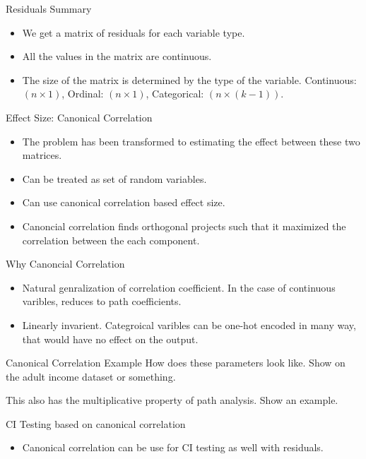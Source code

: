 \documentclass{beamer}
\begin{document}
\begin{frame}{Residuals Summary}
	\begin{itemize}
		\item We get a matrix of residuals for each variable type.
		\item All the values in the matrix are continuous.
		\item The size of the matrix is determined by the type of the variable.
			Continuous: $ (n \times 1) $, Ordinal: $ (n \times 1 ) $, Categorical: $ (n \times (k-1)) $.
	\end{itemize}
\end{frame}

\begin{frame}{Effect Size: Canonical Correlation}
	\begin{itemize}
		\item The problem has been transformed to estimating the effect between these two matrices.
		\item Can be treated as set of random variables. 
		\item Can use canonical correlation based effect size.
		\item Canoncial correlation finds orthogonal projects such that
			it maximized the correlation between the each
			component.
	\end{itemize}

\end{frame}

\begin{frame}{Why Canoncial Correlation}
	\begin{itemize}
		\item Natural genralization of correlation coefficient. In the case of continuous varibles, reduces to path coefficients.
		\item Linearly invarient. Categroical varibles can be one-hot encoded in many way, that would have no effect on the output.
	\end{itemize}
\end{frame}

\begin{frame}{Canonical Correlation Example}
	How does these parameters look like. Show on the adult income dataset
	or something.

	This also has the multiplicative property of path analysis. Show an
	example.
\end{frame}

\begin{frame}{CI Testing based on canonical correlation}
	\begin{itemize}
		\item Canonical correlation can be use for CI testing as well with residuals.

	\end{itemize}	
\end{frame}
\end{document}
